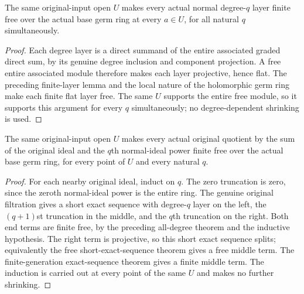 \begin{theorem}
\label{hir:relative-normal-coefficient-algebra-all-degree-free-open}
\leanok
{}
The same original-input open $U$ makes every actual normal degree-$q$
layer finite free over the actual base germ ring at every $a\in U$, for
all natural $q$ simultaneously.
\end{theorem}
\begin{proof}
Each degree layer is a direct summand of the entire associated graded direct
sum, by its genuine degree inclusion and component projection. A free entire
associated module therefore makes each layer projective, hence flat.
The preceding finite-layer lemma and the local nature of the holomorphic germ
ring make each finite flat layer free. The same $U$ supports the entire free
module, so it supports this argument for every $q$ simultaneously; no
degree-dependent shrinking is used.
\end{proof}

\begin{theorem}
\label{hir:relative-normal-coefficient-algebra-all-truncation-free-open}
\leanok
{}
The same original-input open $U$ makes every actual original quotient by the
sum of the original ideal and the $q$th normal-ideal power finite free over
the actual base germ ring, for every point of $U$ and every natural $q$.
\end{theorem}
\begin{proof}
For each nearby original ideal, induct on $q$. The zero truncation is zero,
since the zeroth normal-ideal power is the entire ring. The genuine original
filtration gives a short exact sequence with degree-$q$ layer on the left,
the $(q+1)$st truncation in the middle, and the $q$th truncation on the
right. Both end terms are finite free, by the preceding all-degree theorem
and the inductive hypothesis. The right term is projective, so this short
exact sequence splits; equivalently the free short-exact-sequence theorem
gives a free middle term. The finite-generation exact-sequence theorem gives
a finite middle term. The induction is carried out at every point of the
same $U$ and makes no further shrinking.
\end{proof}
